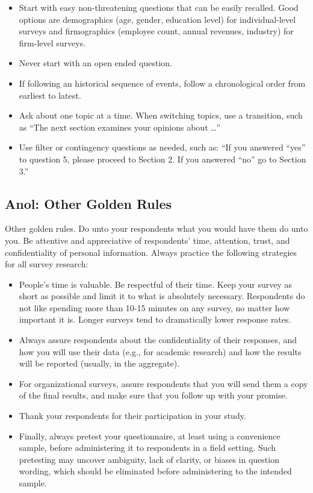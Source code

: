\begin{itemize}
	\item Start with easy non-threatening questions that can be easily recalled. Good options are 	demographics (age, gender, education level) for individual-level surveys and firmographics (employee count, annual revenues, industry) for firm-level surveys.
	\item Never start with an open ended question.
	\item If following an historical sequence of events, follow a chronological order from earliest to latest.
	\item Ask about one topic at a time. When switching topics, use a transition, such as “The next section examines your opinions about …”
	\item Use filter or contingency questions as needed, such as: “If you answered “yes” to question 5, please proceed to Section 2. If you answered “no” go to Section 3.”
\end{itemize}

\subsection{Anol: Other Golden Rules}

Other golden rules. Do unto your respondents what you would have them do unto you. Be attentive and appreciative of respondents’ time, attention, trust, and confidentiality of personal information. Always practice the following strategies for all survey research:

\begin{itemize}
	\item People’s time is valuable. Be respectful of their time. Keep your survey as short as possible and limit it to what is absolutely necessary. Respondents do not like spending more than 10-15 minutes on any survey, no matter how important it is. Longer surveys tend to dramatically lower response rates.
	\item Always assure respondents about the confidentiality of their responses, and how you will use their data (e.g., for academic research) and how the results will be reported (usually, in the aggregate).
	\item For organizational surveys, assure respondents that you will send them a copy of the final results, and make sure that you follow up with your promise.
	\item Thank your respondents for their participation in your study.
	\item Finally, always pretest your questionnaire, at least using a convenience sample, before administering it to respondents in a field setting. Such pretesting may uncover ambiguity, lack of clarity, or biases in question wording, which should be eliminated before administering to the intended sample.
\end{itemize}

